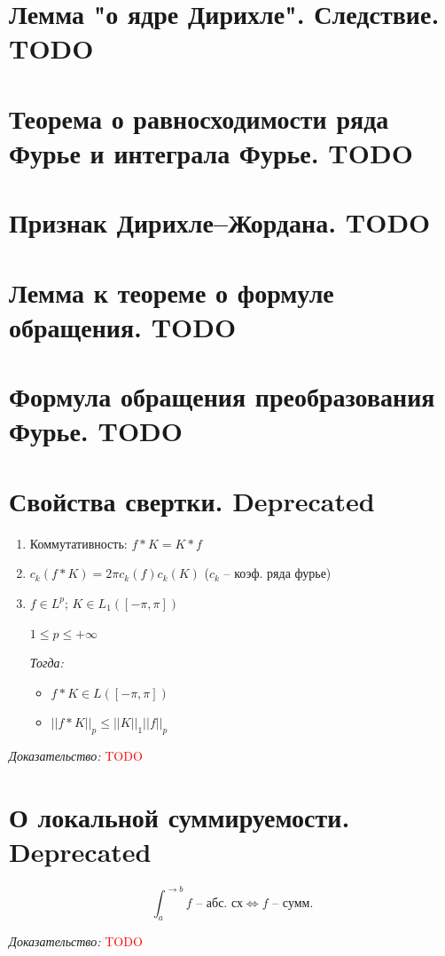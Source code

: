 \documentclass[paper=a4, fontsize=17pt]{article}
\begin{document}
\section{Лемма "о ядре Дирихле". Следствие. TODO}
\section{Теорема о равносходимости ряда Фурье и интеграла Фурье. TODO}
\section{Признак Дирихле--Жордана. TODO}
\section{Лемма к теореме о формуле обращения. TODO}
\section{Формула обращения преобразования Фурье. TODO}


\section{Свойства свертки.  \Large Deprecated}

\begin{enumerate}
	\item Коммутативность: $ f \ast K = K \ast f$
	\item $ c_k(f \ast K) = 2\pi c_k(f) c_k(K) $ ($ c_k $ -- коэф. ряда фурье)
	\item
		$ f \in L^p $; $ K \in L_1( [-\pi, \pi]) $

		$ 1 \leqslant p \leqslant +\infty $

		\emph{Тогда:}
		\begin{itemize}
			\item $ f \ast K \in L([-\pi, \pi]) $
			\item $ ||f \ast K||_{p} \leqslant ||K||_1 ||f||_p $
		\end{itemize}
\end{enumerate}

\emph{Доказательство:} \textcolor{red}{TODO}

\section{О локальной суммируемости. \Large Deprecated}
$$ \int_{a}^{\rightarrow b} f \text{ -- абс. сх} \Longleftrightarrow f \text{ -- сумм.}$$

\emph{Доказательство:} \textcolor{red}{TODO}
\end{document}
